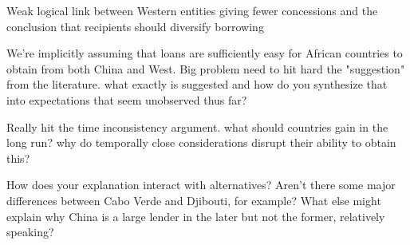 Weak logical link between Western entities giving fewer concessions and the conclusion that recipients should diversify borrowing

We're implicitly assuming that loans are sufficiently easy for African countries to obtain from both China and West. Big problem
need to hit hard the "suggestion" from the literature. what exactly is suggested and how do you synthesize that into expectations that seem unobserved thus far?

Really hit the time inconsistency argument. what should countries gain in the long run? why do temporally close considerations disrupt their ability to obtain this?

How does your explanation interact with alternatives? Aren't there some major differences between Cabo Verde and Djibouti, for example? What else might explain why China is a large lender in the later but not the former, relatively speaking?